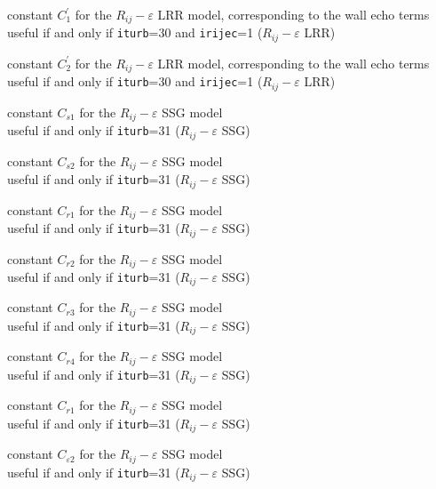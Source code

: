 {constant $C_1^\prime$ for the $R_{ij}-\varepsilon$ LRR model, corresponding to
the wall echo terms\\
useful if and only if {\tt iturb}=30
and {\tt irijec}=1
($R_{ij}-\varepsilon$ LRR)}

{constant $C_2^\prime$ for the $R_{ij}-\varepsilon$ LRR model, corresponding to
the wall echo terms\\
useful if and only if {\tt iturb}=30 and {\tt irijec}=1
($R_{ij}-\varepsilon$ LRR)}


{constant $C_{s1}$ for the $R_{ij}-\varepsilon$ SSG model\\
useful if and only if {\tt iturb}=31
($R_{ij}-\varepsilon$ SSG)}

{constant $C_{s2}$ for the $R_{ij}-\varepsilon$ SSG model\\
useful if and only if {\tt iturb}=31
($R_{ij}-\varepsilon$ SSG)}

{constant $C_{r1}$ for the $R_{ij}-\varepsilon$ SSG model\\
useful if and only if {\tt iturb}=31
($R_{ij}-\varepsilon$ SSG)}

{constant $C_{r2}$ for the $R_{ij}-\varepsilon$ SSG model\\
useful if and only if {\tt iturb}=31
($R_{ij}-\varepsilon$ SSG)}

{constant $C_{r3}$ for the $R_{ij}-\varepsilon$ SSG model\\
useful if and only if {\tt iturb}=31
($R_{ij}-\varepsilon$ SSG)}

{constant $C_{r4}$ for the $R_{ij}-\varepsilon$ SSG model\\
useful if and only if {\tt iturb}=31
($R_{ij}-\varepsilon$ SSG)}

{constant $C_{r1}$ for the $R_{ij}-\varepsilon$ SSG model\\
useful if and only if {\tt iturb}=31
($R_{ij}-\varepsilon$ SSG)}

{constant $C_{\varepsilon 2}$ for the $R_{ij}-\varepsilon$ SSG model\\
useful if and only if {\tt iturb}=31
($R_{ij}-\varepsilon$ SSG)}

